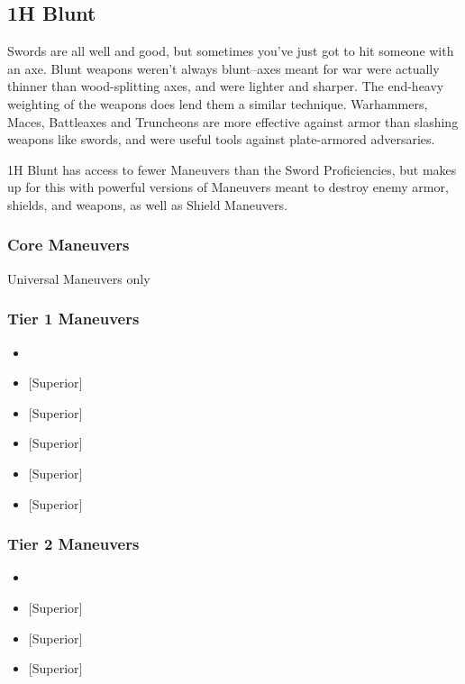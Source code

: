\documentclass[oneside,11pt,english]{book}
\begin{document}
\subsection{1H Blunt}
Swords are all well and good, but sometimes you’ve just got to hit someone with an axe. Blunt 
weapons weren’t always blunt--axes meant for war were actually thinner than wood-splitting axes, and were lighter and sharper. The end-heavy weighting of the weapons does lend them a similar technique. 
Warhammers, Maces, Battleaxes and Truncheons are more effective against armor than slashing weapons 
like swords, and were useful tools against plate-armored adversaries. 

1H Blunt has access to fewer Maneuvers than the Sword Proficiencies, but makes up for this with 
powerful versions of Maneuvers meant to destroy enemy armor, shields, and weapons, as well as Shield Maneuvers.

\subsubsection{Core Maneuvers}
Universal Maneuvers only

\subsubsection{Tier 1 Maneuvers}
\vspace{-5pt}\begin{itemize}
	[itemsep=0.5mm]
	\item {}
	\item {} [Superior]
	\item {} [Superior]
	\item {} [Superior]
	\item {} [Superior]
	\item {} [Superior]
\end{itemize}
\subsubsection{Tier 2 Maneuvers}
\vspace{-5pt}\begin{itemize}
	[itemsep=0.5mm]
	\item {}
	\item {} [Superior] 
	\item {} [Superior] 
	\item {} [Superior] 
\end{itemize}
\end{document}
